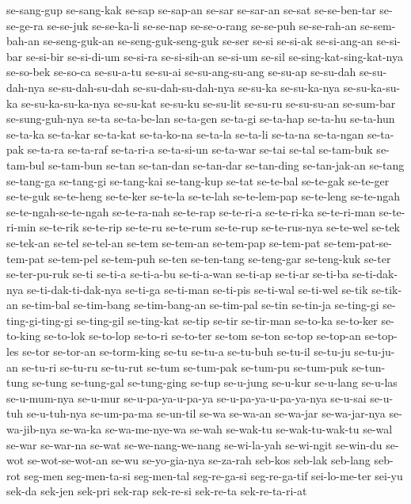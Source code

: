 {se-sang-gup se-sang-kak se-sap se-sap-an se-sar se-sar-an se-sat
se-se-ben-tar se-se-ge-ra se-se-juk se-se-ka-li se-se-nap se-se-o-rang
se-se-puh se-se-rah-an se-sem-bah-an se-seng-guk-an se-seng-guk-seng-guk
se-ser se-si se-si-ak se-si-ang-an se-si-bar se-si-bir se-si-di-um
se-si-ra se-si-sih-an se-si-um se-sil se-sing-kat-sing-kat-nya se-so-bek
se-so-ca se-su-a-tu se-su-ai se-su-ang-su-ang se-su-ap se-su-dah
se-su-dah-nya se-su-dah-su-dah se-su-dah-su-dah-nya se-su-ka se-su-ka-nya
se-su-ka-su-ka se-su-ka-su-ka-nya se-su-kat se-su-ku se-su-lit se-su-ru
se-su-su-an se-sum-bar se-sung-guh-nya se-ta se-ta-be-lan se-ta-gen
se-ta-gi se-ta-hap se-ta-hu se-ta-hun se-ta-ka se-ta-kar se-ta-kat
se-ta-ko-na se-ta-la se-ta-li se-ta-na se-ta-ngan se-ta-pak se-ta-ra
se-ta-raf se-ta-ri-a se-ta-si-un se-ta-war se-tai se-tal se-tam-buk
se-tam-bul se-tam-bun se-tan se-tan-dan se-tan-dar se-tan-ding
se-tan-jak-an se-tang se-tang-ga se-tang-gi se-tang-kai se-tang-kup se-tat
se-te-bal se-te-gak se-te-ger se-te-guk se-te-heng se-te-ker se-te-la
se-te-lah se-te-lem-pap se-te-leng se-te-ngah se-te-ngah-se-te-ngah
se-te-ra-nah se-te-rap se-te-ri-a se-te-ri-ka se-te-ri-man se-te-ri-min
se-te-rik se-te-rip se-te-ru se-te-rum se-te-rup se-te-rus-nya se-te-wel
se-tek se-tek-an se-tel se-tel-an se-tem se-tem-an se-tem-pap se-tem-pat
se-tem-pat-se-tem-pat se-tem-pel se-tem-puh se-ten se-ten-tang se-teng-gar
se-teng-kuk se-ter se-ter-pu-ruk se-ti se-ti-a se-ti-a-bu se-ti-a-wan
se-ti-ap se-ti-ar se-ti-ba se-ti-dak-nya se-ti-dak-ti-dak-nya se-ti-ga
se-ti-man se-ti-pis se-ti-wal se-ti-wel se-tik se-tik-an se-tim-bal
se-tim-bang se-tim-bang-an se-tim-pal se-tin se-tin-ja se-ting-gi
se-ting-gi-ting-gi se-ting-gil se-ting-kat se-tip se-tir se-tir-man
se-to-ka se-to-ker se-to-king se-to-lok se-to-lop se-to-ri se-to-ter
se-tom se-ton se-top se-top-an se-top-les se-tor se-tor-an se-torm-king
se-tu se-tu-a se-tu-buh se-tu-il se-tu-ju se-tu-ju-an se-tu-ri se-tu-ru
se-tu-rut se-tum se-tum-pak se-tum-pu se-tum-puk se-tun-tung se-tung
se-tung-gal se-tung-ging se-tup se-u-jung se-u-kur se-u-lang se-u-las
se-u-mum-nya se-u-mur se-u-pa-ya-u-pa-ya se-u-pa-ya-u-pa-ya-nya se-u-sai
se-u-tuh se-u-tuh-nya se-um-pa-ma se-un-til se-wa se-wa-an se-wa-jar
se-wa-jar-nya se-wa-jib-nya se-wa-ka se-wa-me-nye-wa se-wah se-wak-tu
se-wak-tu-wak-tu se-wal se-war se-war-na se-wat se-we-nang-we-nang
se-wi-la-yah se-wi-ngit se-win-du se-wot se-wot-se-wot-an se-wu
se-yo-gia-nya se-za-rah seb-kos seb-lak seb-lang seb-rot seg-men
seg-men-ta-si seg-men-tal seg-re-ga-si seg-re-ga-tif sei-lo-me-ter sei-yu
sek-da sek-jen sek-pri sek-rap sek-re-si sek-re-ta sek-re-ta-ri-at
}

